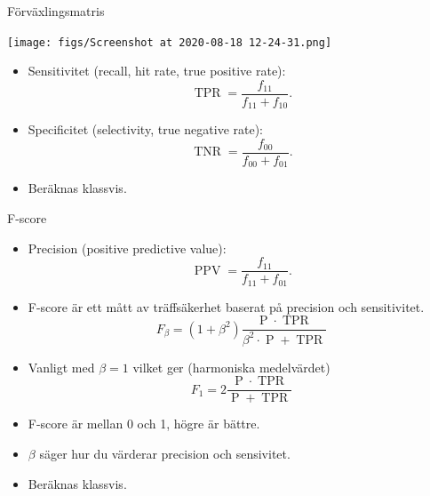 \documentclass[10pt,english]{beamer}
\begin{document}
\begin{frame}{Förväxlingsmatris}
    \begin{center}
        \texttt{[image: figs/Screenshot at 2020-08-18 12-24-31.png]}
    \end{center}
    
    \begin{itemize}
        \item Sensitivitet (recall, hit rate, true positive rate):
        \begin{equation*}
            \operatorname{TPR} = \frac{f_{11} }{f_{11} + f_{10}}.
        \end{equation*}
        \item Specificitet (selectivity, true negative rate):
        \begin{equation*}
            \operatorname{TNR} = \frac{f_{00}}{f_{00} + f_{01}}.
        \end{equation*}
        \item Beräknas klassvis.
    \end{itemize}
        
\end{frame}

\begin{frame}{F-score}
    
    \begin{itemize}
        \item  Precision (positive predictive value):
        \begin{equation*}
            \operatorname{PPV} = \frac{f_{11}}{f_{11} + f_{01}}.
        \end{equation*}
        \item F-score är ett mått av träffsäkerhet baserat på precision och sensitivitet.
        \begin{equation*}
            F_{\beta} = (1 + \beta^2) \frac{\operatorname{P} \cdot \operatorname{TPR}}{\beta^2 \cdot \operatorname{P} + \operatorname{TPR}}
        \end{equation*}
        \item Vanligt med $\beta=1$ vilket ger (harmoniska medelvärdet)
        \begin{equation*}
            F_1 = 2 \frac{\operatorname{P} \cdot \operatorname{TPR}}{\operatorname{P} + \operatorname{TPR}}
        \end{equation*}
        \item F-score är mellan 0 och 1, högre är bättre.
        \item $\beta$ säger hur du värderar precision och sensivitet.
        \item Beräknas klassvis.
    \end{itemize}

\end{frame}
\end{document}
